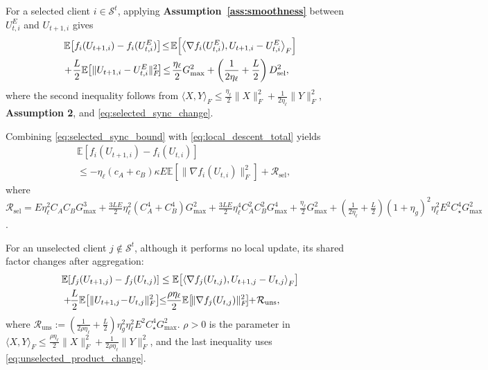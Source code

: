 \documentclass[lettersize,journal]{IEEEtran}
\begin{document}
	
	For a selected client $i \in \mathcal{S}^t$, applying
	\textbf{Assumption~\ref{ass:smoothness}} between
	$U_{t,i}^{E}$ and $U_{t+1,i}$ gives
	{\small
		\begin{align}
			&\mathbb{E}\!\left[f_i(U_{t+1,i})-f_i(U_{t,i}^{E})\right]
			\!\le\!\mathbb{E}\!\left[
			\left\langle
			\nabla f_i(U_{t,i}^{E}),
			U_{t+1,i}-U_{t,i}^{E}
			\right\rangle_F
			\right]
			\notag\\
			&\!+\!\frac{L}{2}\mathbb{E}\!\left[\|U_{t+1,i}-U_{t,i}^{E}\|_F^2\!\right] \!\le\!
			\frac{\eta_{\ell}}{2}G_{\max}^{2} +\left(\frac{1}{2\eta_{\ell}}+\frac{L}{2}\right)D_{\mathrm{sel}}^{2},
			\label{eq:selected_sync_bound}
	\end{align}}
	where the second inequality follows from
	$\langle X,Y\rangle_F
	\le\frac{\eta_{\ell}}{2}\|X\|_F^2
	+\frac{1}{2\eta_{\ell}}\|Y\|_F^2$,
	\textbf{Assumption 2}, and
	\eqref{eq:selected_sync_change}.
	
	Combining \eqref{eq:selected_sync_bound} with
	\eqref{eq:local_descent_total} yields
	\begin{align}
		&\mathbb{E}\!\left[f_i(U_{t+1,i})-f_i(U_{t,i})\right] \nonumber \\
		&\le
		-\eta_{\ell}(c_A+c_B)\kappa E \mathbb{E}\!\left[\|\nabla f_i(U_{t,i})\|_F^2\right] +\mathcal{R}_{\mathrm{sel}},
		\label{eq:selected_bound_app}
	\end{align}
	where $\mathcal{R}_{\mathrm{sel}}= E\eta_{\ell}^{2}C_AC_BG_{\max}^{3}
	+\frac{3LE}{2}\eta_{\ell}^{2}(C_A^{4}+C_B^{4})G_{\max}^{2}+\frac{3LE}{2}\eta_{\ell}^{4}C_A^{2}C_B^{2}G_{\max}^{4}
	\!+\!\frac{\eta_{\ell}}{2}G_{\max}^{2} \!+\!\left(\frac{1}{2\eta_{\ell}}\!+\!\frac{L}{2}\right)(1\!+\!\eta_g)^2\eta_{\ell}^{2}E^{2}C_\star^{4}G_{\max}^{2}$.
	
	For an unselected client $j \notin \mathcal{S}^t$, although it performs no local update, its shared
	factor changes after aggregation:
	{\small
		\begin{align}
			&\mathbb{E}\!\left[f_j(U_{t+1,j})-f_j(U_{t,j})\right]
			\le \mathbb{E}\!\left[
			\left\langle
			\nabla f_j(U_{t,j}),
			U_{t+1,j}-U_{t,j}
			\right\rangle_F
			\right]
			\notag\\
			&+\!\!\frac{L}{2}
			\mathbb{E}\!\left[\|U_{t+1,j}\!-\!U_{t,j}\|_F^2\right]
			\!\!\leq\!\! \frac{\rho\eta_{\ell}}{2}\mathbb{E}\!\left[\!\|\nabla f_j(U_{t,j})\|_F^2\!\right] \!\!+\!\mathcal{R}_{\mathrm{uns}},
			\label{eq:unselected_bound_app}
	\end{align}}
	where $\mathcal{R}_{\mathrm{uns}}:=
	\left(\frac{1}{2\rho\eta_{\ell}}+\frac{L}{2}\right)
	\eta_g^{2}\eta_{\ell}^{2}E^{2}
	C_\star^{4}G_{\max}^{2}$. $\rho>0$ is the parameter in
	$\langle X,Y\rangle_F
	\le\frac{\rho\eta_{\ell}}{2}\|X\|_F^2
	+\frac{1}{2\rho\eta_{\ell}}\|Y\|_F^2$, and the last inequality
	uses \eqref{eq:unselected_product_change}.
	
\end{document}
